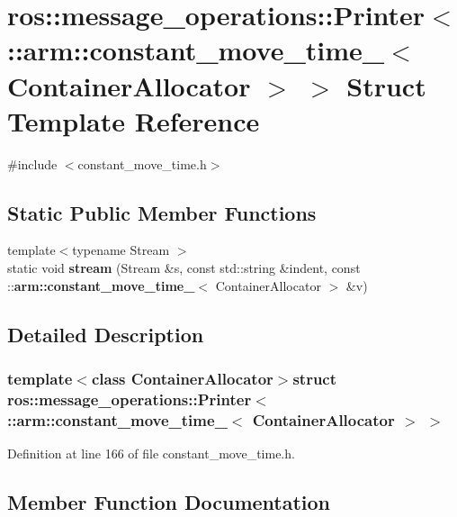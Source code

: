 \section{ros\-:\-:message\-\_\-operations\-:\-:\-Printer$<$ \-:\-:arm\-:\-:constant\-\_\-move\-\_\-time\-\_\-$<$ \-Container\-Allocator $>$ $>$ \-Struct \-Template \-Reference}
\label{structros_1_1message__operations_1_1Printer_3_01_1_1arm_1_1constant__move__time___3_01ContainerAllocator_01_4_01_4}


{\ttfamily \#include $<$constant\-\_\-move\-\_\-time.\-h$>$}

\subsection*{\-Static \-Public \-Member \-Functions}
\begin{DoxyCompactItemize}
\item 
{\footnotesize template$<$typename Stream $>$ }\\static void {\bf stream} (\-Stream \&s, const std\-::string \&indent, const \-::{\bf arm\-::constant\-\_\-move\-\_\-time\-\_\-}$<$ \-Container\-Allocator $>$ \&v)
\end{DoxyCompactItemize}


\subsection{\-Detailed \-Description}
\subsubsection*{template$<$class Container\-Allocator$>$struct ros\-::message\-\_\-operations\-::\-Printer$<$ \-::arm\-::constant\-\_\-move\-\_\-time\-\_\-$<$ Container\-Allocator $>$ $>$}



\-Definition at line 166 of file constant\-\_\-move\-\_\-time.\-h.



\subsection{\-Member \-Function \-Documentation}
